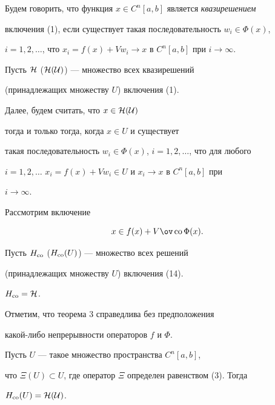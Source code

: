 Будем говорить, что функция $x\in C^n[a,b]$ является {\it квазирешением}


включения (1), если существует такая последовательность $w_i\in\Phi(x)$,


$i=1,2,\dotsc$, что $x_i=f(x)+V{w_i}\to x$ в $C^n[a,b]$ при $i\to\infty$.


Пусть $\cal H$ ($\cal H(U)$) --- множество всех квазирешений


(принадлежащих множеству $U$) включения (1).


Далее, будем считать, что $x\in\cal H(U)$


тогда и только тогда, когда $x\in U$ и существует


такая последовательность $w_i\in\Phi(x)$, $i=1,2,\dotsc$, что для любого


$i=1,2,\dotsc$\; $x_i=f(x)+Vw_i\in U$ и $x_i\to x$ в $C^n[a,b]$ при


$i\to\infty$.





Рассмотрим включение


\begin{equation}


x\in f(x)+V\ov\co\Phi(x).


\end{equation}





Пусть $H_{\operatorname{co}}$ ($H_{\operatorname{co}}(U)$) --- множество всех решений


(принадлежащих множеству $U$) включения (14).





\begin{thm} $H_{\operatorname{co}}=\cal H$.


\end{thm}





\begin{note} Отметим, что теорема 3 справедлива без предположения


какой-либо непрерывности операторов $f$ и $\Phi$.


\end{note}





\begin{cor} Пусть $U$ --- такое множество пространства $C^n[a,b]$,


что $\Xi(U)\subset U$, где оператор $\Xi$ определен равенством (3). Тогда


$H_{\operatorname{co}}(U)=\cal H (U)$.


\end{cor}





